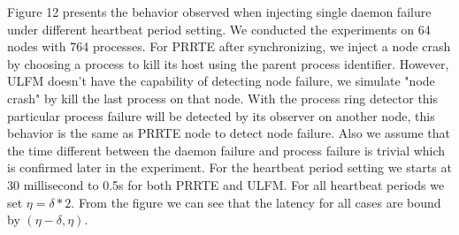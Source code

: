 \documentclass[sigconf]{acmart}
\begin{document}
Figure 12 presents the behavior observed when injecting single daemon failure under different heartbeat period setting. We conducted the experiments on 64 nodes with 764 processes. For PRRTE after synchronizing, we inject a node crash by choosing a process to kill its host using the parent process identifier. However, ULFM doesn't have the capability of detecting node failure, we simulate "node crash" by kill the last process on that node. With the process ring detector this particular process failure will be detected by its observer on another node, this behavior is the same as PRRTE node to detect node failure. Also we assume that the time different between the daemon failure and process failure is trivial which is confirmed later in the experiment. For the heartbeat period setting we starts at 30 millisecond to 0.5s for both PRRTE and ULFM. For all heartbeat periods we set $ \eta = \delta * 2 $. From the figure we can see that the latency for all cases are bound by $ (\eta - \delta,\eta) $.
\end{document}
